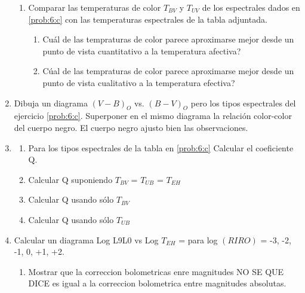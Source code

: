 \documentclass[12pt,spanish,a4paper]{practice}
\begin{document}
\begin{enumerate}[wide, labelwidth=!, labelindent=0pt, label=\textbf{\textrm{\arabic*)}}, ref=\arabic*]
\begin{enumerate}
            \item\label{prob:6:d} Comparar las temperaturas de color $T_{BV}$ y $T_{UV}$ de los espectrales dados en \ref{prob:6:c} con las temperaturas espectrales de la tabla adjuntada.

                \begin{enumerate}
                    \item\label{prob:6:d:i} Cuál de las tempraturas de color parece aproximarse mejor desde un punto de vista cuantitativo a la temperatura afectiva?\\
                    \item\label{prob:6:d:ii} Cúal de las tempraturas de color parece aproximarse mejor desde un punto de vista cualitativo a la temperatura efectiva?
                \end{enumerate}
        \end{enumerate}

    \item\label{prob:7} Dibuja un diagrama $\left(V-B\right)_O$ vs. $\left(B-V\right)_O$ pero los tipos espectrales del ejercicio \ref{prob:6:c}. Superponer en el mismo diagrama la relación color-color del cuerpo negro. El cuerpo negro ajusto bien las observaciones.

    \item\label{prob:8}\hfill
        \begin{enumerate}
            \item \label{prob:8:a} Para los tipos espectrales de la tabla en \ref{prob:6:c} Calcular el coeficiente Q.

            \item \label{prob:8:b} Calcular Q suponiendo $T_{BV}$ = $T_{UB}$ = $T_{EH}$

            \item \label{prob:8:c} Calcular Q usando sólo $T_{BV}$

            \item \label{prob:8:d} Calcular Q usando sólo $T_{UB}$
        \end{enumerate}

    \item\label{prob:9}Calcular un diagrama Log L9L0 vs Log $T_{EH}$ = para log $\left(RIRO\right)$ = -3, -2, -1, 0, +1, +2.

        \begin{enumerate}
            \item\label{prob:9:a} Mostrar que la correccion bolometricas enre magnitudes NO SE QUE DICE  es igual a la correccion bolometrica entre magnitudes absolutas.
       \end{enumerate}


\end{enumerate}
\end{document}
